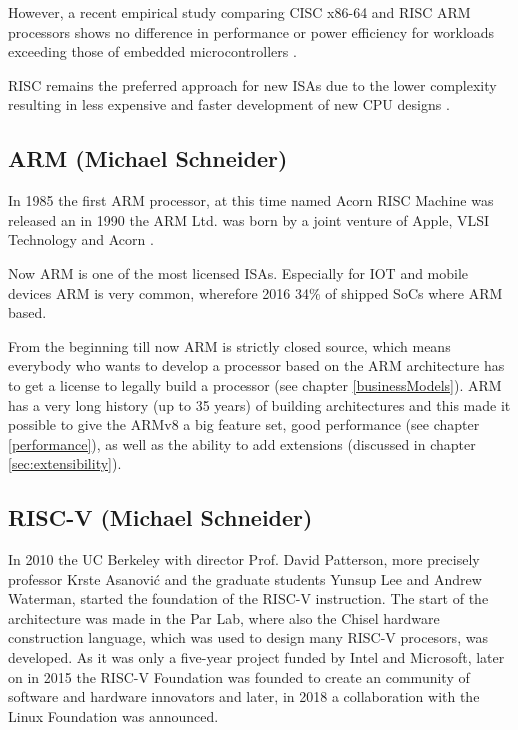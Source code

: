 \documentclass[conference]{IEEEtran}
\begin{document}
	However, a recent empirical study comparing \gls{CISC} x86-64 and \gls{RISC} ARM processors shows no difference in performance or power efficiency
	for workloads exceeding those of embedded microcontrollers \cite{Blem2013}.

	\gls{RISC} remains the preferred approach for new \glspl{ISA} due to the lower complexity resulting in less expensive and faster
	development of new CPU designs \cite{George1990}. 

	\subsection{ARM (Michael Schneider)}
	In 1985 the first ARM processor, at this time named Acorn RISC Machine was released an in 1990 the ARM Ltd. was born by a joint venture of Apple, VLSI Technology and Acorn \cite{Levy2005}.

	 Now ARM is one of the most licensed \glspl{ISA}. Especially for IOT and mobile devices ARM is very common, wherefore 2016 34\% of shipped SoCs where ARM based. \cite[slide 7-10]{Holdings2018}

	From the beginning till now ARM is strictly closed source, which means everybody who wants to develop a processor based on the ARM architecture has to get a license to legally build a processor (see chapter \ref{businessModels}). ARM has a very long history (up to 35 years) of building architectures and this made it possible to give the ARMv8 a big feature set, good performance (see chapter \ref{performance}), as well as the ability to add extensions (discussed in chapter \ref{sec:extensibility}).
	
	\subsection{RISC-V (Michael Schneider)}
	In 2010 the UC Berkeley with director Prof. David Patterson, more precisely professor Krste Asanovi\'{c} and the graduate students Yunsup Lee and Andrew Waterman, started the foundation of the RISC-V instruction. The start of the architecture was made in the \gls{Par Lab}, where also the Chisel hardware construction language, which was used to design many RISC-V procesors, was developed. As it was only a five-year project funded by Intel and Microsoft, later on in 2015 the RISC-V Foundation was founded to create an community of software and hardware innovators and later, in 2018 a collaboration with the Linux Foundation was announced. \cite{International2020}
\end{document}
